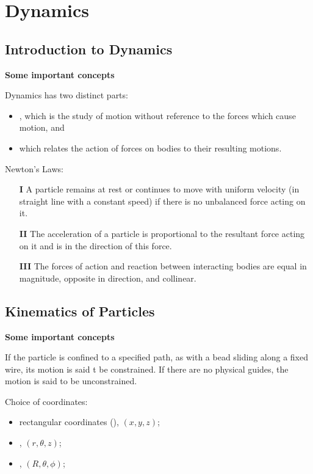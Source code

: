 \section{Dynamics}

\subsection{Introduction to Dynamics}

\textbf{Some important concepts}

Dynamics has two distinct parts: 
\begin{itemize}
  \item {}, 
    which is the study of motion without reference to the 
    forces which cause motion, and
  \item {} which relates the action of forces 
    on bodies to their resulting motions.
\end{itemize}

Newton's Laws:
\begin{itemize}
  \item[\textbf{I}] A particle remains at rest or continues to move with uniform
    velocity (in straight line with a constant speed) if there is no unbalanced 
    force acting on it.
  \item[\textbf{II}] The acceleration of a particle is proportional to the
    resultant force acting on it and is in the direction of this force.
  \item[\textbf{III}] The forces of action and reaction between interacting
    bodies are equal in magnitude, opposite in direction, and collinear.
\end{itemize}

\subsection{Kinematics of Particles}

\textbf{Some important concepts}

If the particle is confined to a specified path, as with a bead sliding along a
fixed wire, its motion is said t be constrained. 
If there are no physical guides, the motion is said to be unconstrained.

Choice of coordinates:
\begin{itemize}
  \item rectangular coordinates (), $(x, y, z)$;
  \item {}, $(r, \theta, z)$;
  \item {}, $(R, \theta, \phi)$;
\end{itemize}

